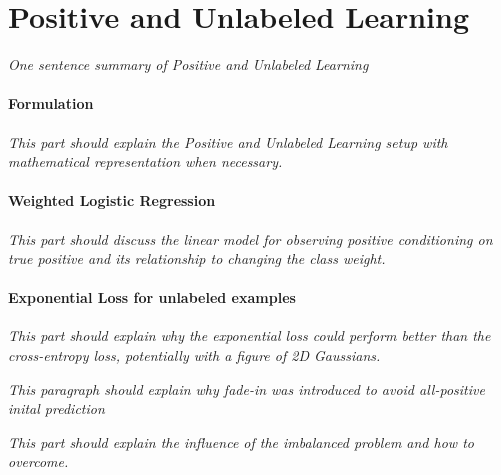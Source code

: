 \section{Positive and Unlabeled Learning}
\label{sec:pulearning}

\textit{One sentence summary of Positive and Unlabeled Learning}


\paragraph{Formulation}
\noindent
\textit{This part should explain the Positive and Unlabeled Learning setup with mathematical representation when necessary.}


\paragraph{Weighted Logistic Regression}
\noindent
\textit{This part should discuss the linear model for observing positive conditioning on true positive and its relationship to changing the class weight.}


\paragraph{Exponential Loss for unlabeled examples}
\noindent
\textit{This part should explain why the exponential loss could perform better than the cross-entropy loss, potentially with a figure of 2D Gaussians.}


\noindent
\textit{This paragraph should explain why fade-in was introduced to avoid all-positive inital prediction}


\noindent
\textit{This part should explain the influence of the imbalanced problem and how to overcome.}



